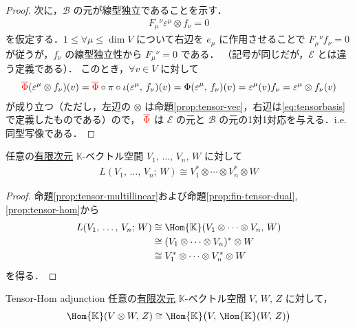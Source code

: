 \documentclass[geometry_main]{subfiles}
\begin{document}
\begin{proof}
{        次に，$\mathcal{B}$ の元が線型独立であることを示す．
        \begin{align}
            F_{\mu}{}^\nu \varepsilon^\mu \otimes f_\nu = 0
        \end{align}
        を仮定する．$1 \le \forall \mu \le \dim V$ について右辺を $e_\mu$ に作用させることで $F_\mu{}^\nu f_\nu = 0$ が従うが，$f_\nu$ の線型独立性から $F_{\mu}{}^\nu = 0$ である．
    }
    （記号が同じだが，$\mathcal{E}$ とは違う定義である）．
	このとき，$\forall v \in V$ に対して
	\begin{align}
		\textcolor{red}{\overline{\Phi}}(\varepsilon^\mu \otimes f_\nu )(v) = \textcolor{red}{\overline{\Phi}} \circ \pi \circ \iota(\varepsilon^\mu,\, f_\nu )(v) = \Phi(\varepsilon^\mu,\, f_\nu)(v) = \varepsilon^\mu (v) f_\nu = \varepsilon^\mu \otimes f_\nu(v)
	\end{align}
	が成り立つ（ただし，左辺の $\otimes$ は命題\ref{prop:tensor-vec}，右辺は\eqref{eq:tensorbasis}で定義したものである）ので，
	$\textcolor{red}{\overline{\Phi}}$ は $\mathcal{E}$ の元と $\mathcal{B}$ の元の1対1対応を与える．i.e. 同型写像である．
\end{proof}


\begin{mycol}[label=col:tensor-multillinear]{}
    任意の\underline{有限次元} $\mathbb{K}$-ベクトル空間 $V_1,\, \dots,\, V_n,\, W$ に対して
    \begin{align}
        L(V_1,\, \dots,\, V_n;\, W) \cong V_1^* \otimes \cdots \otimes V_n^* \otimes W
    \end{align}
\end{mycol}

\begin{proof}
    命題\ref{prop:tensor-multillinear}および命題\ref{prop:fin-tensor-dual}, \ref{prop:tensor-hom}から
    \begin{align}
        L(V_1,\, \dots,\, V_n;\, W) 
        &\cong \Hom{\mathbb{K}}(V_1 \otimes \cdots \otimes V_n,\, W) \\
        &\cong (V_1 \otimes \cdots \otimes V_n)^* \otimes W \\
        &\cong V_1^* \otimes \cdots \otimes V_n^* \otimes W
    \end{align}
    を得る．
\end{proof}

\begin{mycol}[label=col:tensor-hom-adj]{Tensor-Hom adjunction}
    任意の\underline{有限次元} $\mathbb{K}$-ベクトル空間 $V,\, W,\, Z$ に対して，
    \begin{align}
        \Hom{\mathbb{K}} (V \otimes W,\, Z) \cong \Hom{\mathbb{K}} \bigl( V,\, \Hom{\mathbb{K}} (W,\, Z) \bigr) 
    \end{align}
\end{mycol}
\end{document}
